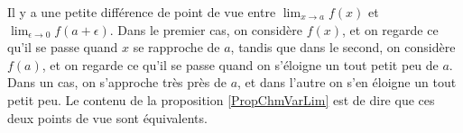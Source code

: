 Il y a une petite différence de point de vue entre $\lim_{x\to a}f(x)$ et $\lim_{\epsilon\to 0}f(a+\epsilon)$. Dans le premier cas, on considère $f(x)$, et on regarde ce qu'il se passe quand $x$ se rapproche de $a$, tandis que dans le second, on considère $f(a)$, et on regarde ce qu'il se passe quand on s'éloigne un tout petit peu de $a$. Dans un cas, on s'approche très près de $a$, et dans l'autre on s'en éloigne un tout petit peu. Le contenu de la proposition \ref{PropChmVarLim} est de dire que ces deux points de vue sont équivalents.


